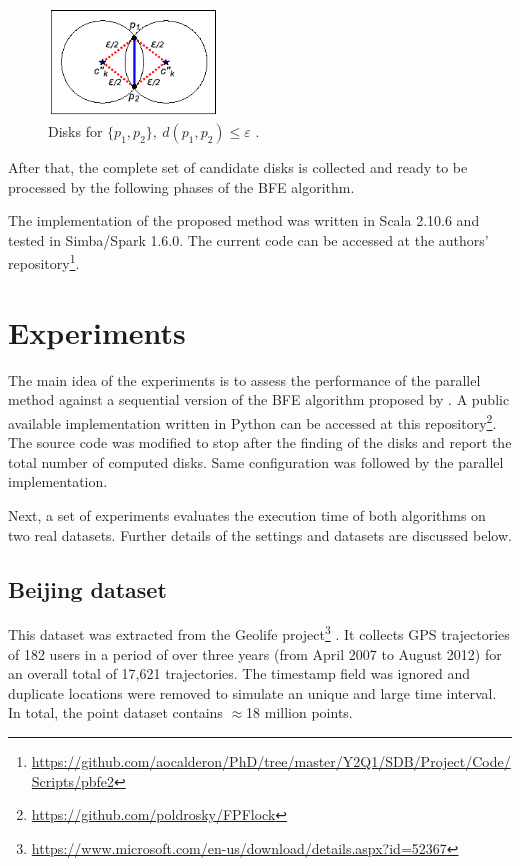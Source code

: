 \documentclass[12pt]{scrartcl}
\begin{document}
\begin{figure}
 \centering
 \includegraphics[width=0.4\textwidth]{figures/theorem} 
 \caption{Disks for $\{p_1,p_2\},\ d(p_1,p_2) \leq \varepsilon$ \cite{vieira_-line_2009}.}
 \label{fig:theorem}
\end{figure}

After that, the complete set of candidate disks is collected and ready to be processed by the following phases of the BFE algorithm. 

The implementation of the proposed method was written in Scala 2.10.6 and tested in Simba/Spark 1.6.0.  The current code can be accessed at the authors' repository\footnote{ \url{https://github.com/aocalderon/PhD/tree/master/Y2Q1/SDB/Project/Code/Scripts/pbfe2}}.

\section{Experiments}\label{sec:experiments}
The main idea of the experiments is to assess the performance of the parallel method against a sequential version of the BFE algorithm proposed by \cite{vieira_-line_2009}.  A public available implementation written in Python can be accessed at this repository\footnote{\url{https://github.com/poldrosky/FPFlock}}.  The source code was modified to stop after the finding of the disks and report the total number of computed disks.  Same configuration was followed by the parallel implementation.

Next, a set of experiments evaluates the execution time of both algorithms on two real datasets.  Further details of the settings and datasets are discussed below.

\subsection{Beijing dataset}
This dataset was extracted from the Geolife project\footnote{\url{https://www.microsoft.com/en-us/download/details.aspx?id=52367}} \cite{zheng_understanding_2008, zheng_mining_2009, zheng_geolife:_2010}.  It collects GPS trajectories of 182 users in a period of over three years (from April 2007 to August 2012) for an overall total of 17,621 trajectories.  The timestamp field was ignored and duplicate locations were removed to simulate an unique and large time interval.  In total, the point dataset contains $\approx$18 million points.
\end{document}
